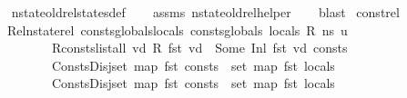 \begin{isabellebody}
%
\isadelimproof
\ \ %
\endisadelimproof
%
\isatagproof
{}\isamarkupfalse%
\ nstate{\isacharunderscore}{\kern0pt}old{\isacharunderscore}{\kern0pt}rel{\isacharunderscore}{\kern0pt}states{\isacharunderscore}{\kern0pt}def\isanewline
\ \ \isamarkupfalse%
\ assms\ nstate{\isacharunderscore}{\kern0pt}old{\isacharunderscore}{\kern0pt}rel{\isacharunderscore}{\kern0pt}helper\isanewline
\ \ \isamarkupfalse%
\ blast%
\endisatagproof
{\isafoldproof}%
%
\isadelimproof
%
\endisadelimproof
%
\isadelimdocument
%
\endisadelimdocument
%
\isatagdocument
%
\isamarkuptrue%
%
\endisatagdocument
{\isafolddocument}%
%
\isadelimdocument
%
\endisadelimdocument
{}\isamarkupfalse%
\ const{\isacharunderscore}{\kern0pt}rel{\isacharcolon}{\kern0pt}\isanewline
\ \ \ Rel{\isacharcolon}{\kern0pt}{\isachardoublequoteopen}nstate{\isacharunderscore}{\kern0pt}rel\ {\isacharparenleft}{\kern0pt}{\isacharparenleft}{\kern0pt}consts{\isacharat}{\kern0pt}globals{\isacharparenright}{\kern0pt}{\isacharcomma}{\kern0pt}locals{\isacharparenright}{\kern0pt}\ {\isacharparenleft}{\kern0pt}consts{\isacharat}{\kern0pt}globals{}{\isacharcomma}{\kern0pt}\ locals{}{\isacharparenright}{\kern0pt}\ R\ ns\ u{\isachardoublequoteclose}\ \isanewline
\ \ \ \ \ \ \ \ \ \ R{\isacharunderscore}{\kern0pt}consts{\isacharcolon}{\kern0pt}{\isachardoublequoteopen}list{\isacharunderscore}{\kern0pt}all\ {\isacharparenleft}{\kern0pt}{\isasymlambda}vd{\isachardot}{\kern0pt}\ R\ {\isacharparenleft}{\kern0pt}fst\ vd{\isacharparenright}{\kern0pt}\ {\isacharequal}{\kern0pt}\ Some\ {\isacharparenleft}{\kern0pt}Inl\ {\isacharparenleft}{\kern0pt}fst\ vd{\isacharparenright}{\kern0pt}{\isacharparenright}{\kern0pt}{\isacharparenright}{\kern0pt}\ consts{\isachardoublequoteclose}\ \isanewline
\ \ \ \ \ \ \ \ \ \ ConstsDisj{\isacharcolon}{\kern0pt}{\isachardoublequoteopen}set\ {\isacharparenleft}{\kern0pt}map\ fst\ consts{\isacharparenright}{\kern0pt}\ {\isasyminter}\ set\ {\isacharparenleft}{\kern0pt}map\ fst\ locals{\isacharparenright}{\kern0pt}\ {\isacharequal}{\kern0pt}\ {\isacharbraceleft}{\kern0pt}{\isacharbraceright}{\kern0pt}{\isachardoublequoteclose}\ \isanewline
\ \ \ \ \ \ \ \ \ \ ConstsDisj{}{\isacharcolon}{\kern0pt}{\isachardoublequoteopen}set\ {\isacharparenleft}{\kern0pt}map\ fst\ consts{\isacharparenright}{\kern0pt}\ {\isasyminter}\ set\ {\isacharparenleft}{\kern0pt}map\ fst\ locals{}{\isacharparenright}{\kern0pt}\ {\isacharequal}{\kern0pt}\ {\isacharbraceleft}{\kern0pt}{\isacharbraceright}{\kern0pt}{\isachardoublequoteclose}\isanewline

\end{isabellebody}
